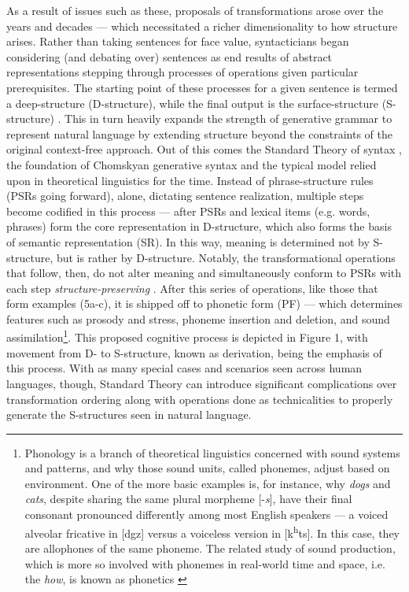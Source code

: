 \documentclass{article}
\begin{document}
As a result of issues such as these, proposals of transformations arose over the years and decades — which necessitated a richer dimensionality to how structure arises. Rather than taking sentences for face value, syntacticians began considering (and debating over) sentences as end results of abstract representations stepping through processes of operations given particular prerequisites. The starting point of these processes for a given sentence is termed a deep-structure (D-structure), while the final output is the surface-structure (S-structure) \citep{Chomsky57, Chomsky65}. This in turn heavily expands the strength of generative grammar to represent natural language by extending structure beyond the constraints of the original context-free approach. Out of this comes the Standard Theory of syntax \citep{Chomsky65}, the foundation of Chomskyan generative syntax and the typical model relied upon in theoretical linguistics for the time. Instead of phrase-structure rules (PSRs going forward), alone, dictating sentence realization, multiple steps become codified in this process --- after PSRs and lexical items (e.g. words, phrases) form the core representation in D-structure, which also forms the basis of semantic representation (SR). In this way, meaning is determined not by S-structure, but is rather by D-structure. Notably, the transformational operations that follow, then, do not alter meaning and simultaneously conform to PSRs with each step \textit{structure-preserving} \citep{Emonds70}. After this series of operations, like those that form examples (5a-c), it is shipped off to phonetic form (PF) --- which determines features such as prosody and stress, phoneme insertion and deletion, and sound assimilation\footnote{Phonology is a branch of theoretical linguistics concerned with sound systems and patterns, and why those sound units, called phonemes, adjust based on environment. One of the more basic examples is, for instance, why \textit{dogs} and \textit{cats}, despite sharing the same plural morpheme [-\textit{s}], have their final consonant pronounced differently among most English speakers --- a voiced alveolar fricative in [\textipa{\textprimstress}d\textipa{\textopeno}gz] versus a voiceless version in [\textipa{\textprimstress}k\textsuperscript{h}\textipa{\ae}ts]. In this case, they are allophones of the same phoneme. The related study of sound production, which is more so involved with phonemes in real-world time and space, i.e. the \textit{how}, is known as phonetics \citep[for past and present inquiry into theoretical and experimental phonological systems of language, see][]{Chomsky67,JescheniakLevelt94, Cohn2012}}. This proposed cognitive process is depicted in Figure 1, with movement from D- to S-structure, known as derivation, being the emphasis of this process. With as many special cases and scenarios seen across human languages, though, Standard Theory can introduce significant complications over transformation ordering along with operations done as technicalities to properly generate the S-structures seen in natural language.
\end{document}

